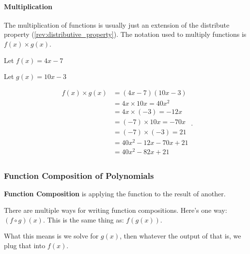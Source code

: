 
\paragraph{Multiplication}
\label{par:multiplication}

The multiplication of functions is usually just an extension of the distribute
property (\ref{rev:distributive_property}). The notation used to multiply
functions is $f(x) \times g(x)$.

\begin{example}
  \label{exm:multiplication}

  Let $f(x) = 4x - 7$

  Let $g(x) = 10x - 3$ 

  \begin{equation}
    \label{eqt:multiplication}
    \begin{split}
      f(x) \times g(x) &= (4x - 7)(10x - 3) \\
                  &= 4x \times 10x = 40x^{2} \\
                  &= 4x \times (-3) = -12x \\
                  &= (-7) \times 10x = -70x \\
                  &= (-7) \times (-3) = 21 \\
                  &= 40x^{2} - 12x - 70x + 21 \\
                  &= \boxed{40x^{2} - 82x + 21} \\
    \end{split}
  .\end{equation}

\end{example}



\subsubsection{Function Composition of Polynomials}
\label{sub_sub_sec:function_composition_of_polynomials}

\begin{definition}
  \label{def:function_composition}

  \textbf{Function Composition} is applying the function to the result of
  another.  

  There are multiple ways for writing function compositions. Here's one way:
  $(f \circ g)(x)$. This is the same thing as: $f(g(x))$. 

  What this means is we solve for $g(x)$, then whatever the output of that is, we
  plug that into $f(x)$.
\end{definition}

